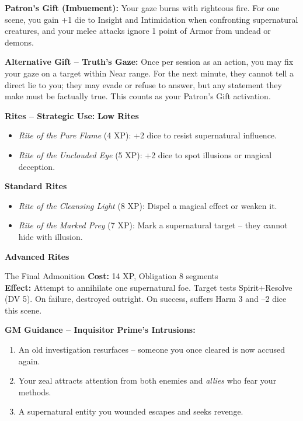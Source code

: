 \documentclass[10pt,a5paper]{book}
\begin{document}
\textbf{Patron's Gift (Imbuement):} Your gaze burns with righteous fire. For one scene, you gain +1 die to Insight and Intimidation when confronting supernatural creatures, and your melee attacks ignore 1 point of Armor from undead or demons.

\textbf{Alternative Gift -- Truth's Gaze:} Once per session as an action, you may fix your gaze on a target within Near range. For the next minute, they cannot tell a direct lie to you; they may evade or refuse to answer, but any statement they make must be factually true. This counts as your Patron's Gift activation.

\textbf{Rites -- Strategic Use:}
\textbf{Low Rites}
\begin{itemize}
    \item \textit{Rite of the Pure Flame} (4 XP): +2 dice to resist supernatural influence.
    \item \textit{Rite of the Unclouded Eye} (5 XP): +2 dice to spot illusions or magical deception.
\end{itemize}
\textbf{Standard Rites}
\begin{itemize}
    \item \textit{Rite of the Cleansing Light} (8 XP): Dispel a magical effect or weaken it.
    \item \textit{Rite of the Marked Prey} (7 XP): Mark a supernatural target -- they cannot hide with illusion.
\end{itemize}
\textbf{Advanced Rites}
\begin{patronbox}{The Final Admonition}
\textbf{Cost:} 14 XP, Obligation 8 segments \\
\textbf{Effect:} Attempt to annihilate one supernatural foe. Target tests Spirit+Resolve (DV 5). On failure, destroyed outright. On success, suffers Harm 3 and --2 dice this scene.
\end{patronbox}

\textbf{GM Guidance -- Inquisitor Prime's Intrusions:}
\begin{enumerate}
    \item An old investigation resurfaces -- someone you once cleared is now accused again.
    \item Your zeal attracts attention from both enemies and \textit{allies} who fear your methods.
    \item A supernatural entity you wounded escapes and seeks revenge.
\end{enumerate}

\clearpage
\end{document}
